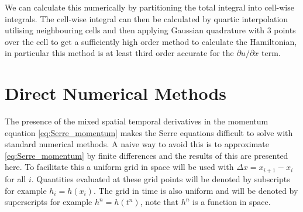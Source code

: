 \documentclass[SingleSpace,12pt,Journal]{Serre_ASCE}
\begin{document}
We can calculate this numerically by partitioning the total integral into cell-wise integrals. The cell-wise integral can then be calculated by quartic interpolation utilising neighbouring cells and then applying Gaussian quadrature with $3$ points over the cell to get a sufficiently high order method to calculate the Hamiltonian, in particular this method is at least third order accurate for the $\partial u / \partial x$ term. 
\section{Direct Numerical Methods} 
\label{sec:DirNumMet}
The presence of the mixed spatial temporal derivatives in the momentum equation \eqref{eq:Serre_momentum} makes the Serre equations difficult to solve with standard numerical methods. A naive way to avoid this is to approximate \eqref{eq:Serre_momentum} by finite differences and the results of this are presented here. To facilitate this a uniform grid in space will be used with $\Delta x  = x_{i+1} - x_i$ for all $i$. Quantities evaluated at these grid points will be denoted by subscripts for example $h_i = h(x_i)$. The grid in time is also uniform and will be denoted by superscripts for example $h^n = h(t^n)$, note that $h^n$ is a function in space. 
\end{document}
